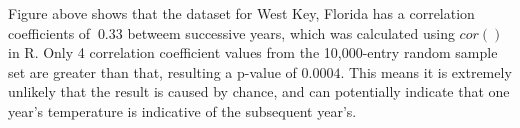 \documentclass[10pt]{article}
\begin{document}
    Figure above shows that the dataset for West Key, Florida has a correlation coefficients of $~0.33$ betweem successive years, which was calculated using $cor()$ in R. Only 4 correlation coefficient values from the 10,000-entry random sample set are greater than that, resulting a p-value of $0.0004$. This means it is extremely unlikely that the result is caused by chance, and can potentially indicate that one year's temperature is indicative of the subsequent year's.
\end{document}

